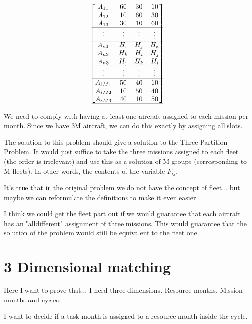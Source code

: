 \documentclass[a4paper,11pt]{article}
\begin{document}
    $$
    \begin{bmatrix}
        A_{11} & 60 & 30 & 10 \\
        A_{12} & 10 & 60 & 30 \\
        A_{13} & 30 & 10 & 60 \\\hline
        \vdots & \vdots & \vdots & \vdots \\\hline
        A_{n1} & H_i & H_j & H_k \\
        A_{n2} & H_k & H_i & H_j \\
        A_{n3} & H_j & H_k & H_i \\\hline
        \vdots & \vdots & \vdots & \vdots \\\hline
        A_{3M1} & 50 & 40 & 10  \\
        A_{3M2} & 10 & 50 & 40  \\
        A_{3M3} & 40 & 10 & 50  \\\hline
    \end{bmatrix}
    $$

    We need to comply with having at least one aircraft assigned to each mission per month. Since we have 3M aircraft, we can do this exactly by assigning all slots.

    The solution to this problem should give a solution to the Three Partition Problem. It would just suffice to take the three missions assigned to each fleet (the order is irrelevant) and use this as a solution of M groups (corresponding to M fleets). In other words, the contents of the variable $F_{ij}$.

    It's true that in the original problem we do not have the concept of fleet... but maybe we can reformulate the definitions to make it even easier.

    I think we could get the fleet part out if we would guarantee that each aircraft has an "alldifferent" assignment of three missions. This would guarantee that the solution of the problem would still be equivalent to the fleet one.

\clearpage

\section{3 Dimensional matching}

Here I want to prove that... I need three dimensions. Resource-months, Mission-months and cycles.

I want to decide if a task-month is assigned to a resource-month inside the cycle.
\end{document}
